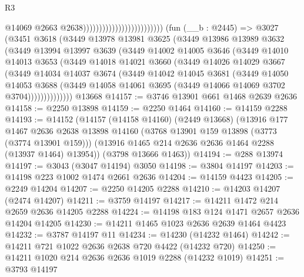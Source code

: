 \begin{lexlean}{R3}
\begin{coremodule}
                                                      @14069
                                                      @2663
                                                      @2638)))))))))))))))))))))))))
    (fun (__b : @2445) =>
    @3027
      (@3451
        @3618
        (@3449
          @13978
          @13981
          @3625
          (@3449
            @13986
            @13989
            @3632
            (@3449
              @13994
              @13997
              @3639
              (@3449
                @14002
                @14005
                @3646
                (@3449
                  @14010
                  @14013
                  @3653
                  (@3449
                    @14018
                    @14021
                    @3660
                    (@3449
                      @14026
                      @14029
                      @3667
                      (@3449
                        @14034
                        @14037
                        @3674
                        (@3449
                          @14042
                          @14045
                          @3681
                          (@3449
                            @14050
                            @14053
                            @3688
                            (@3449
                              @14058
                              @14061
                              @3695
                              (@3449 @14066 @14069 @3702 @3704))))))))))))))
    @13668
@14157 := @3746 @13901 @661 @1468 @2639 @2636
@14158 := @2250 @13898
@14159 := @2250 @1464
@14160 := @14159 @2288
@14193 := @14152
    (@14157
      (@14158 @14160)
      (@2449 @13668)
      (@13916
        @177
        @1467
        @2636
        @2638
        @13898
        @14160
        (@3768 @13901 @159 @13898 (@3773 (@3774 @13901 @159)))
        (@13916 @1465 @214 @2636 @2636 @1464 @2288 (@13937 @1464) @13954))
      (@3798 @13666 @1463))
@14194 := @288 @13974
@14197 := @3043 (@3047 @14194) @3050
@14198 := @3804 @14197
@14203 := @14198 @223 @1002 @1474 @2661 @2636
@14204 := @14159 @4423
@14205 := @2249 @14204
@14207 := @2250 @14205 @2288
@14210 := @14203 @14207 (@2474 @14207)
@14211 := @3759 @14197
@14217 := @14211 @1472 @214 @2659 @2636 @14205 @2288
@14224 := @14198 @183 @124 @1471 @2657 @2636 @14204 @14205
@14230 := @14211 @1465 @1023 @2636 @2639 @1464 @4423
@14232 := @3787 @14197 @11
@14234 := @14230 (@14232 @1464)
@14242 := @14211 @721 @1022 @2636 @2638 @720 @4422 (@14232 @720)
@14250 := @14211 @1020 @214 @2636 @2636 @1019 @2288 (@14232 @1019)
@14251 := @3793 @14197

\end{coremodule}
\end{lexlean}
